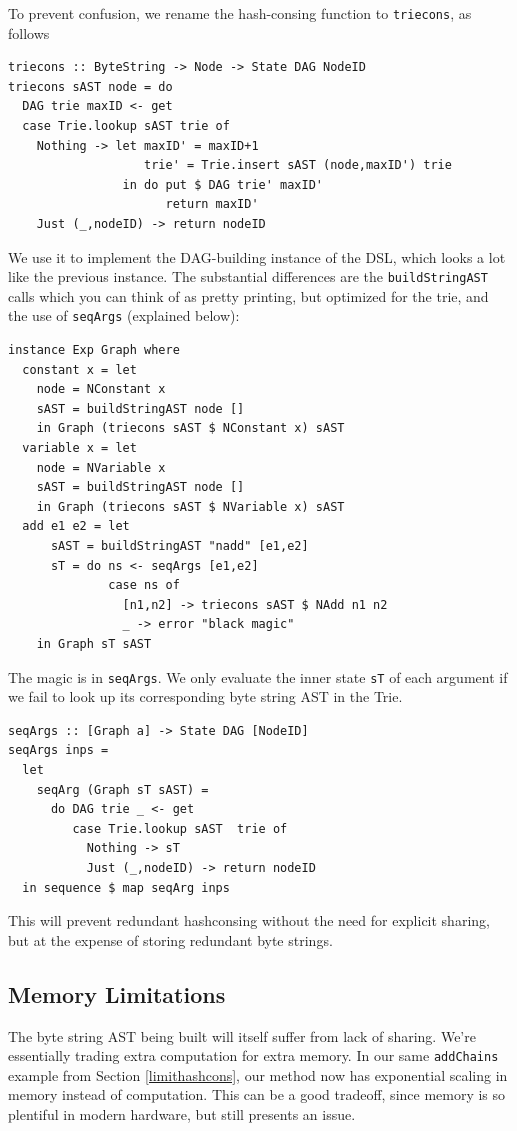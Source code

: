 \documentclass[runningheads]{llncs}
\begin{document}
To prevent confusion, we rename the hash-consing function to \texttt{triecons}, as follows
\begin{verbatim}
triecons :: ByteString -> Node -> State DAG NodeID
triecons sAST node = do
  DAG trie maxID <- get
  case Trie.lookup sAST trie of
    Nothing -> let maxID' = maxID+1
                   trie' = Trie.insert sAST (node,maxID') trie
                in do put $ DAG trie' maxID'
                      return maxID'
    Just (_,nodeID) -> return nodeID
\end{verbatim}
We use it to implement the DAG-building instance of the DSL,
which looks a lot like the previous instance.
The substantial differences are the 
\texttt{buildStringAST} calls
which you can think of as pretty printing, but optimized for the trie,
and the use of \texttt{seqArgs} (explained below):
\begin{verbatim}
instance Exp Graph where
  constant x = let
    node = NConstant x
    sAST = buildStringAST node []
    in Graph (triecons sAST $ NConstant x) sAST
  variable x = let
    node = NVariable x
    sAST = buildStringAST node []
    in Graph (triecons sAST $ NVariable x) sAST
  add e1 e2 = let
      sAST = buildStringAST "nadd" [e1,e2]
      sT = do ns <- seqArgs [e1,e2]
              case ns of
                [n1,n2] -> triecons sAST $ NAdd n1 n2
                _ -> error "black magic"
    in Graph sT sAST
\end{verbatim}
The magic is in \texttt{seqArgs}.
We only evaluate the inner state \texttt{sT} of each argument if we
fail to look up its corresponding byte string AST in the Trie.
\begin{verbatim}
seqArgs :: [Graph a] -> State DAG [NodeID]
seqArgs inps =
  let
    seqArg (Graph sT sAST) =
      do DAG trie _ <- get
         case Trie.lookup sAST  trie of
           Nothing -> sT
           Just (_,nodeID) -> return nodeID
  in sequence $ map seqArg inps
\end{verbatim}

This will prevent
redundant hashconsing without the need for explicit sharing,
but at the expense of storing redundant byte strings. 

\subsection{Memory Limitations}
The byte string AST being built will itself suffer from lack of sharing. We're
essentially trading extra computation for extra memory. In our same
\texttt{addChains} example from Section \ref{limithashcons}, our
method now has exponential scaling in memory instead of computation. This can be
a good tradeoff, since memory is so plentiful in modern hardware, but still
presents an issue.
\end{document}
